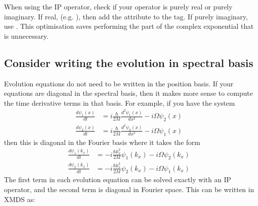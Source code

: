 \documentclass[letterpaper,10pt,english]{sphinxmanual}
\begin{document}
\sphinxAtStartPar
When using the IP operator, check if your operator is purely real or purely imaginary.  If real, (e.g. ), then add the attribute  to the  tag.  If purely imaginary, use .  This optimisation saves performing the part of the complex exponential that is unnecessary.


\subsection{Consider writing the evolution in spectral basis}
\label{\detokenize{optimisation_hints:consider-writing-the-evolution-in-spectral-basis}}
\sphinxAtStartPar
Evolution equations do not need to be written in the position basis.  If your equations are diagonal in the spectral basis, then it makes more sense to compute the time derivative terms in that basis.  For example, if you have the system
\begin{equation*}
\begin{split}\frac{d\psi_1(x)}{dt} &= i \frac{\hbar}{2M} \frac{d^2\psi_1(x)}{dx^2} - i \Omega \psi_2(x)\\
\frac{d\psi_2(x)}{dt} &= i \frac{\hbar}{2M} \frac{d^2\psi_2(x)}{dx^2} - i \Omega \psi_1(x)\end{split}
\end{equation*}
\sphinxAtStartPar
then this is diagonal in the Fourier basis where it takes the form
\begin{equation*}
\begin{split}\frac{d\psi_1(k_x)}{dt} &= -i \frac{\hbar k_x^2}{2M} \psi_1(k_x) - i \Omega \psi_2(k_x)\\
\frac{d\psi_2(k_x)}{dt} &= -i \frac{\hbar k_x^2}{2M} \psi_2(k_x) - i \Omega \psi_1(k_x)\end{split}
\end{equation*}
\sphinxAtStartPar
The first term in each evolution equation can be solved exactly with an IP operator, and the second term is diagonal in Fourier space.  This can be written in XMDS as:
\end{document}
